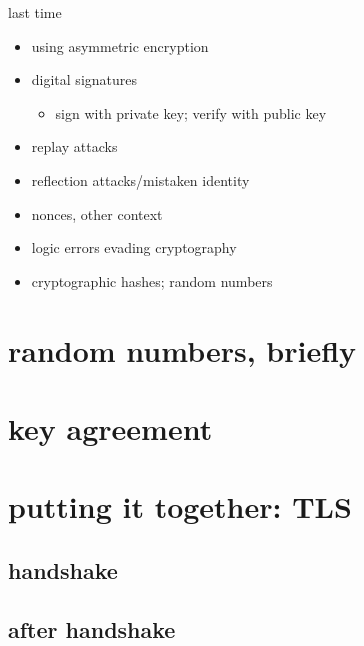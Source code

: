 \date{}
\title{}
\date{}
\usepackage{pgfplots}
\pgfplotsset{compat=1.16}

\begin{frame}
    \titlepage
\end{frame}

\begin{frame}{last time}
    \begin{itemize}
    \item using asymmetric encryption
    \item digital signatures
        \begin{itemize}
        \item sign with private key; verify with public key
        \end{itemize}
    \item replay attacks
    \item reflection attacks/mistaken identity
    \item nonces, other context
    \item logic errors evading cryptography
    \item cryptographic hashes; random numbers
    \end{itemize}
\end{frame}

\section{random numbers, briefly}


\section{key agreement}


\section{putting it together: TLS}

\subsection{handshake}


\subsection{after handshake}



